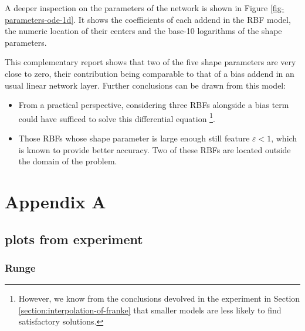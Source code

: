 \documentclass[12pt]{report} %
\begin{document}
A deeper inspection on the parameters of the network is shown in Figure \ref{fig-parameters-ode-1d}.
It shows the coefficients of each addend in the RBF model, the numeric location of
their centers and the base-10 logarithms of the shape parameters.

This complementary report shows that two of the five shape parameters are very close to zero,
their contribution being comparable to that of a bias addend in an usual linear network layer. 
Further conclusions can be drawn from this model:
\begin{itemize}
  \item From a practical perspective, considering three 
  RBFs alongside a bias term could have sufficed to solve this differential equation
  \footnote{However, we know from the conclusions devolved in the experiment in Section
   \ref{section:interpolation-of-franke} that smaller models are less likely to find
   satisfactory solutions.}.
  \item Those RBFs whose shape parameter is large enough still feature $\varepsilon<1$, which is
  known to provide better accuracy. Two of these RBFs are located outside the 
  domain of the problem.
\end{itemize} 








\clearpage


\printbibliography




\chapter*{Appendix A}\label{appendix-1d}

\section*{plots from experiment}

\subsection*{Runge}
\end{document}
